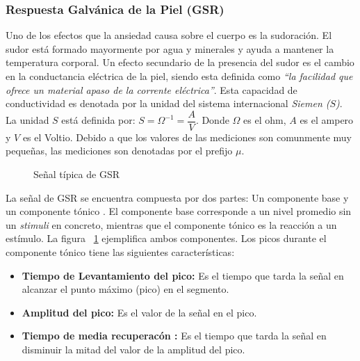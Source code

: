 	\subsubsection{Respuesta Galv\'anica de la Piel (GSR)}\label{secc:gsr}
	Uno de los efectos que la ansiedad causa sobre el cuerpo es la sudoraci\'on. El sudor est\'a formado mayormente por agua y minerales y ayuda a mantener la temperatura corporal. Un efecto secundario de la presencia del sudor es el cambio en la conductancia el\'ectrica de la piel, siendo esta definida como \textit{``la facilidad que ofrece un material apaso de la corrente el\'ectrica''}. Esta capacidad de conductividad es denotada por la unidad del sistema internacional \textit{Siemen ($S$)}. La unidad $S$ est\'a definida por: $S = \Omega^{-1} = \dfrac{A}{V}$. Donde $\Omega$ es el ohm, $A$ es el ampero y $V$ es el Voltio. Debido a que los valores de las mediciones son comunmente muy peque\~nas, las mediciones son denotadas por el prefijo $\mu$.
	\begin{figure}[h]
		\centering
		\caption{Se\~nal t\'ipica de GSR \label{fig:GSRsignal}}
	\end{figure}

	La se\~nal de GSR se encuentra compuesta por dos partes: Un componente base y un componente t\'onico \citep{Katsis2011261}. El componente base corresponde a un nivel promedio sin un \textit{stimuli} en concreto, mientras que el componente t\'onico es la reacci\'on a un est\'imulo. La figura ~\ref{fig:GSRsignal} ejemplifica ambos componentes. Los picos durante el componente t\'onico tiene las siguientes caracter\'isticas:

\begin{itemize}
        \item{\textbf{Tiempo de Levantamiento del pico:}} Es el tiempo que tarda la se\~nal en alcanzar el punto m\'aximo (pico) en el segmento.
        \item{\textbf{Amplitud del pico:}} Es el valor de la se\~nal en el pico.
        \item{\textbf{Tiempo de media recuperac\'on :}} Es el tiempo que tarda la se\~nal en disminuir la mitad del valor de la amplitud del pico.
\end{itemize}


